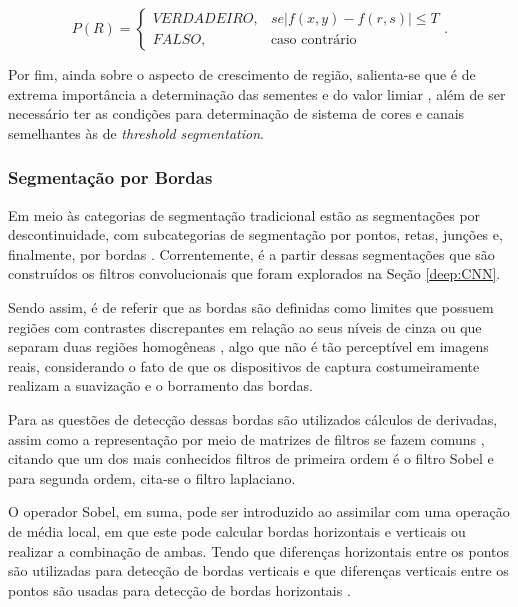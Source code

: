 \begin{equation}
\label{segment:eq:3}
P(R) = \left\{\begin{matrix}
    VERDADEIRO, & se |f(x,y) - f(r,s)| \leq T \\
    FALSO,      &  \text{caso contrário}
\end{matrix}\right..
\end{equation}

Por fim, ainda sobre o aspecto de crescimento de região, salienta-se que é de extrema importância a determinação das sementes e do valor limiar \cite{Yuheng2017, pedrini2008analise}, além de ser necessário ter as condições para determinação de sistema de cores e canais semelhantes às de \textit{threshold segmentation}.


\subsubsection{Segmentação por Bordas}
\label{segment:limit}

Em meio às categorias de segmentação tradicional estão as segmentações por descontinuidade, com subcategorias de segmentação por pontos, retas, junções e, finalmente, por bordas \cite{pedrini2008analise}. Correntemente, é a partir dessas segmentações que são construídos os filtros convolucionais que foram explorados na Seção \ref{deep:CNN}.

Sendo assim, é de referir que as bordas são definidas como limites que possuem regiões com contrastes discrepantes em relação ao seus níveis de cinza  ou que separam duas regiões homogêneas \cite{pedrini2008analise,Yuheng2017}, algo que não é tão perceptível em imagens reais, considerando o fato de que os dispositivos de captura costumeiramente realizam a suavização e o borramento das bordas.

Para as questões de detecção dessas bordas são utilizados cálculos de derivadas, assim  como a representação por meio de matrizes de filtros se fazem comuns \cite{pedrini2008analise, muthukrishnan2011edge}, citando que um dos mais conhecidos filtros de primeira ordem é o filtro Sobel e para segunda ordem, cita-se o filtro laplaciano.

O operador Sobel, em suma, pode ser introduzido ao assimilar com uma operação de média local, em que este pode calcular bordas horizontais e verticais ou realizar a combinação de ambas. Tendo que diferenças horizontais entre os pontos são utilizadas para detecção de bordas verticais e que diferenças verticais entre os pontos são usadas para detecção de bordas horizontais \cite{pedrini2008analise}.

